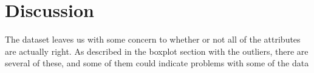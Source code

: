 \section{Discussion}
The dataset leaves us with some concern to whether or not all of the attributes are actually right. As described in the boxplot section with the outliers, there are several of these, and some of them could indicate problems with some of the data